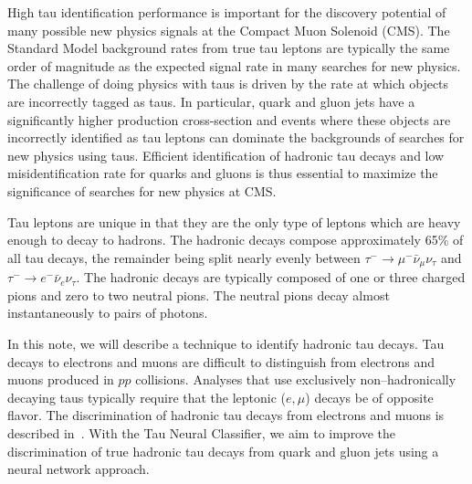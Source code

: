 High tau identification performance is important for the discovery potential of
many possible new physics signals at the Compact Muon Solenoid (CMS).  The
Standard Model background rates from true tau leptons are typically the same
order of magnitude as the expected signal rate in many searches for new
physics.  The challenge of doing physics with taus is driven by the rate at
which objects are incorrectly tagged as taus.  In particular, quark and gluon
jets have a significantly higher production cross-section and events where
these objects are incorrectly identified as tau leptons can dominate the
backgrounds of searches for new physics using taus.  Efficient identification
of hadronic tau decays and low misidentification rate for quarks and gluons
is thus essential to maximize the significance of searches for new physics at
CMS.



Tau leptons are unique in that they are the only type of leptons which are heavy
enough to decay to hadrons.  The hadronic decays compose approximately 65\% of
all tau decays, the remainder being split nearly evenly between $\tau^{-}
\rightarrow \mu^{-} \bar \nu_\mu \nu_\tau$ and $\tau^{-} \rightarrow e^{-} \bar
\nu_e \nu_\tau$.  The hadronic decays are typically composed of one or three charged
pions and zero to two neutral pions.  The neutral pions decay almost
instantaneously to pairs of photons.

In this note, we will describe a technique to identify hadronic tau decays.  Tau
decays to electrons and muons are difficult to distinguish from electrons and
muons produced in $pp$ collisions.  Analyses that use exclusively
non--hadronically decaying taus typically require that the leptonic ($e,\mu$)
decays be of opposite flavor.  The discrimination of hadronic tau decays from
electrons and muons is described in~\cite{CMS-PAS-PFT-08-001}. With the Tau Neural
Classifier, we aim to improve the discrimination of true hadronic tau decays
from quark and gluon jets using a neural network approach.

